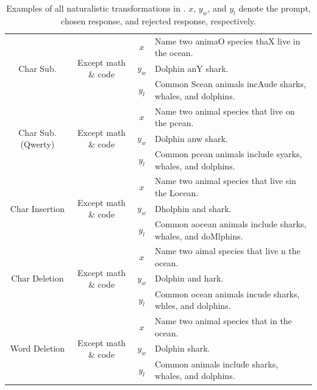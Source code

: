 \begin{table}[h!]
\begin{tabular}{c|c|c@{\hspace{3pt}}l}
        \midrule
        \multirow{3}{*}{Char Sub.} & \multirow{3}{*}{Except math \& code} & $x$ & Name two animaO species thaX live in the ocean. \\ && $y_w$ & Dolphin anY shark. \\ && $y_l$ & Common Scean animals incAude sharks, whales, and dolphins. \\
        \midrule
        \multirow{3}{*}{Char Sub. (Qwerty)} & \multirow{3}{*}{Except math \& code} & $x$ & Name two animal species that live on the pcean. \\ && $y_w$ & Dolphin anw shark. \\ && $y_l$ & Common pcean animals include syarks, whales, and dolphins. \\
        \midrule
        \multirow{3}{*}{Char Insertion} & \multirow{3}{*}{Except math \& code} & $x$ & Name two animal species that live sin the Locean. \\ && $y_w$ & Dholphin and shark. \\ && $y_l$ & Common aocean animals include sharks, whales, and doMlphins. \\
        \midrule
        \multirow{3}{*}{Char Deletion} & \multirow{3}{*}{Except math \& code} & $x$ & Name two aimal species that live n the ocean. \\ && $y_w$ & Dolphin and hark. \\ && $y_l$ & Common ocean animals incude sharks, whles, and dolphins. \\
        \midrule
        \multirow{3}{*}{Word Deletion} & \multirow{3}{*}{Except math \& code} & $x$ & Name two animal species that in the ocean. \\ && $y_w$ & Dolphin shark. \\ && $y_l$ & Common animals include sharks, whales, and dolphins. \\
        \bottomrule
    \end{tabular}
    \caption{\label{tab:benchmark-examples-natural-full}
    Examples of all naturalistic transformations in \benchmark. $x$, $y_w$, and $y_l$ denote the prompt, chosen response, and rejected response, respectively.
    }
\end{table}

